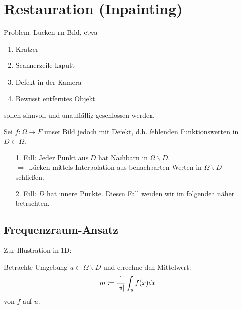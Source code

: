                 \section{Restauration (Inpainting)}
  Problem: Lücken im Bild, etwa

  \begin{enumerate}
    \item Kratzer
    \item Scannerzeile kaputt
    \item Defekt in der Kamera
    \item Bewusst entferntes Objekt
  \end{enumerate}
  sollen sinnvoll und unauffällig geschlossen werden.

  Sei $f: \Omega \to F$ unser Bild jedoch mit Defekt, d.h. fehlenden Funktionswerten in $D \subset \Omega$.

  \begin{enumerate}
    \item[1. Fall:] Jeder Punkt aus $D$ hat Nachbarn in $\Omega \backslash D$.\\
    $\Rightarrow$ Lücken mittels Interpolation aus benachbarten Werten in $\Omega \backslash D$ schließen.
    \item[2. Fall:] $D$ hat innere Punkte. Diesen Fall werden wir im folgenden näher betrachten.
  \end{enumerate}

  \subsection{Frequenzraum-Ansatz}
    Zur Illustration in 1D:
    \begin{center}
    \end{center}
    Betrachte Umgebung $u \subset \Omega \backslash D$ und errechne den Mittelwert:
    \[ m \coloneqq  \frac{1}{\left| u \right|} \int_u f(x) dx\]
    von $f$ auf $u$.

